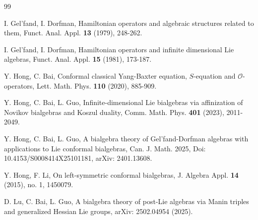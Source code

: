 \documentclass[12pt]{amsart}
\begin{document}
\begin{thebibliography}{99}

I. Gel'fand, I. Dorfman, Hamiltonian operators and algebraic
structures related to them, Funct. Anal. Appl. {\bf 13} (1979),
248-262.

I. Gel'fand, I. Dorfman, Hamiltonian operators and infinite
dimensional Lie algebras, Funct. Anal. Appl. {\bf 15} (1981),
173-187.


Y. Hong, C. Bai, Conformal classical Yang-Baxter equation,
$S$-equation and $\mathcal{O}$-operators, Lett. Math. Phys.
{\bf110} (2020), 885-909.

Y. Hong, C. Bai, L. Guo, Infinite-dimensional Lie bialgebras via
affinization of Novikov bialgebras and Koszul duality, Comm. Math.
Phys. {\bf 401} (2023),  2011-2049.

Y. Hong, C. Bai, L. Guo,  A bialgebra theory of Gel'fand-Dorfman
algebras with applications to Lie conformal bialgebras, Can. J.
Math. 2025, Doi: 10.4153/S0008414X25101181, arXiv: 2401.13608.

%
 Y. Hong, F. Li, On left-symmetric conformal bialgebras, J. Algebra Appl. {\bf 14} (2015), no. 1, 1450079.


D. Lu, C. Bai, L. Guo, A bialgebra theory of post-Lie algebras via Manin triples and generalized Hessian Lie groups,  arXiv: 2502.04954 (2025).





\end{thebibliography}
\end{document}

